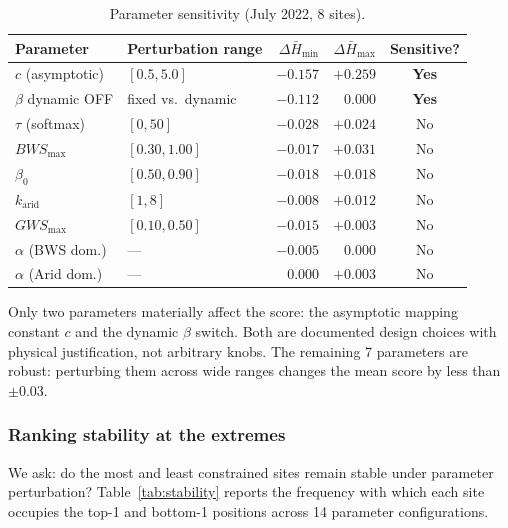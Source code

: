 \documentclass[11pt,a4paper]{article}
\begin{document}
\begin{table}[h]
\centering
\small
\caption{Parameter sensitivity (July 2022, 8 sites).}
\label{tab:sensitivity}
\begin{tabular}{llrrc}
\toprule
Parameter & Perturbation range & $\Delta\bar{H}_{\min}$ & $\Delta\bar{H}_{\max}$ & Sensitive? \\
\midrule
$c$ (asymptotic)        & $[0.5, 5.0]$      & $-0.157$ & $+0.259$ & \textbf{Yes} \\
$\beta$ dynamic OFF     & fixed vs.\ dynamic & $-0.112$ & $0.000$  & \textbf{Yes} \\
$\tau$ (softmax)        & $[0, 50]$         & $-0.028$ & $+0.024$ & No \\
$BWS_{\max}$            & $[0.30, 1.00]$    & $-0.017$ & $+0.031$ & No \\
$\beta_0$               & $[0.50, 0.90]$    & $-0.018$ & $+0.018$ & No \\
$k_{\text{arid}}$       & $[1, 8]$          & $-0.008$ & $+0.012$ & No \\
$GWS_{\max}$            & $[0.10, 0.50]$    & $-0.015$ & $+0.003$ & No \\
$\alpha$ (BWS dom.)     & ---               & $-0.005$ & $0.000$  & No \\
$\alpha$ (Arid dom.)    & ---               & $0.000$  & $+0.003$ & No \\
\bottomrule
\end{tabular}
\end{table}

Only two parameters materially affect the score: the asymptotic mapping constant $c$ and the dynamic $\beta$ switch. Both are documented design choices with physical justification, not arbitrary knobs. The remaining 7 parameters are robust: perturbing them across wide ranges changes the mean score by less than $\pm 0.03$.

\subsubsection{Ranking stability at the extremes}

We ask: do the most and least constrained sites remain stable under parameter perturbation? Table~\ref{tab:stability} reports the frequency with which each site occupies the top-1 and bottom-1 positions across 14 parameter configurations.
\end{document}
